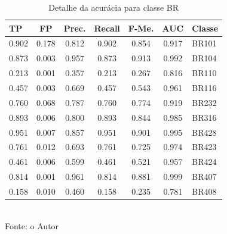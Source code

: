 \begin{enumerate}
	\begin{table}[!ht]
		\centering
		\caption{Detalhe da acurácia para classe BR}
		\vspace{1mm}
		\begin{tabular}{l|c|c|c|c|c|l}
			\hline
			\textbf{TP} & \textbf{FP} & \textbf{Prec.} & \textbf{Recall} & \textbf{F-Me.} & \textbf{AUC} & \textbf{Classe} \\
			\hline
			0.902 & 0.178 & 0.812 & 0.902 & 0.854 & 0.917 & BR101 \\
			0.873 & 0.003 & 0.957 & 0.873 & 0.913 & 0.992 & BR104 \\
			0.213 & 0.001 & 0.357 & 0.213 & 0.267 & 0.816 & BR110 \\
			0.457 & 0.003 & 0.669 & 0.457 & 0.543 & 0.961 & BR116 \\
			0.760 & 0.068 & 0.787 & 0.760 & 0.774 & 0.919 & BR232 \\
			0.893 & 0.006 & 0.800 & 0.893 & 0.844 & 0.985 & BR316 \\
			0.951 & 0.007 & 0.857 & 0.951 & 0.901 & 0.995 & BR428 \\
			0.761 & 0.012 & 0.693 & 0.761 & 0.725 & 0.974 & BR423 \\
			0.461 &	0.006 &	0.599 & 0.461 &	0.521 & 0.957 & BR424 \\
			0.814 & 0.001 & 0.961 & 0.814 & 0.881 & 0.999 & BR407 \\
			0.158 & 0.010 & 0.460 & 0.158 & 0.235 & 0.781 & BR408 \\
		\end{tabular}
		\\
		\tiny Fonte: o Autor
	\end{table}
	

\end{enumerate}
